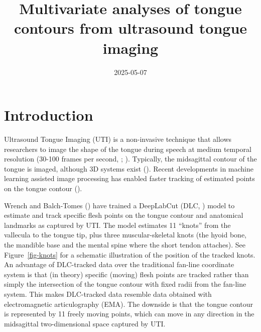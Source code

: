 \documentclass[
  man,
  longtable,
  nolmodern,
  notxfonts,
  notimes,
  colorlinks=true,linkcolor=blue,citecolor=blue,urlcolor=blue]{apa7}
\title{Multivariate analyses of tongue contours from ultrasound tongue
imaging}
\affiliation{
{University of Edinburgh}}
\date{2025-05-07}
\begin{document}
\maketitle


\setcounter{secnumdepth}{-\maxdimen} %

\setlength\LTleft{0pt}


\section{Introduction}\label{introduction}

Ultrasound Tongue Imaging (UTI) is a non-invasive technique that allows
researchers to image the shape of the tongue during speech at medium
temporal resolution (30-100 frames per second,
;
). Typically, the midsagittal
contour of the tongue is imaged, although 3D systems exist
(). Recent developments in
machine learning assisted image processing has enabled faster tracking
of estimated points on the tongue contour
().

Wrench and Balch-Tomes () have trained a
DeepLabCut (DLC, ) model
to estimate and track specific flesh points on the tongue contour and
anatomical landmarks as captured by UTI. The model estimates 11
``knots'' from the vallecula to the tongue tip, plus three
muscular-skeletal knots (the hyoid bone, the mandible base and the
mental spine where the short tendon attaches). See
Figure~\ref{fig-knots} for a schematic illustration of the position of
the tracked knots. An advantage of DLC-tracked data over the traditional
fan-line coordinate system is that (in theory) specific (moving) flesh
points are tracked rather than simply the intersection of the tongue
contour with fixed radii from the fan-line system. This makes
DLC-tracked data resemble data obtained with electromagnetic
articulography (EMA). The downside is that the tongue contour is
represented by 11 freely moving points, which can move in any direction
in the midsagittal two-dimensional space captured by UTI.
\end{document}

